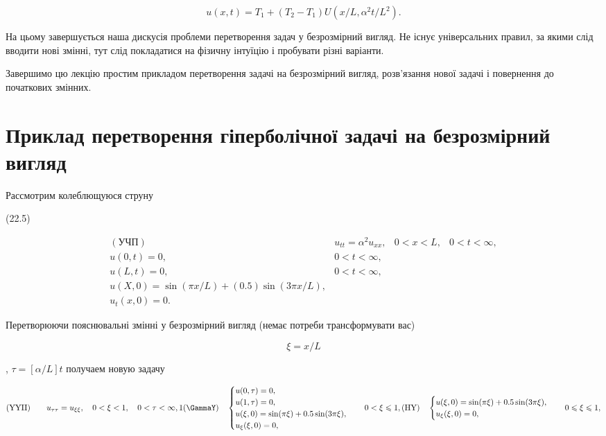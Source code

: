 \documentclass[
  ukrainian,
]{article}
\begin{document}
\[
u(x, t) = T_1 + (T_2 - T_1) U(x/L, \alpha^2 t/L^2).
\]

На цьому завершується наша дискусія проблеми перетворення задач у
безрозмірний вигляд. Не існує універсальних правил, за якими слід
вводити нові змінні, тут слід покладатися на фізичну інтуїцію і
пробувати різні варіанти.

Завершимо цю лекцію простим прикладом перетворення задачі на
безрозмірний вигляд, розв'язання нової задачі і повернення до початкових
змінних.

\section{Приклад перетворення гіперболічної задачі на безрозмірний
вигляд}\label{ux43fux440ux438ux43aux43bux430ux434-ux43fux435ux440ux435ux442ux432ux43eux440ux435ux43dux43dux44f-ux433ux456ux43fux435ux440ux431ux43eux43bux456ux447ux43dux43eux457-ux437ux430ux434ux430ux447ux456-ux43dux430-ux431ux435ux437ux440ux43eux437ux43cux456ux440ux43dux438ux439-ux432ux438ux433ux43bux44fux434}

Рассмотрим колеблющуюся струну

(22.5)

\[
\begin{array}{llll} (\text{УЧП}) & u_{tt} = \alpha^2 u_{xx}, & 0 < x < L, & 0 < t < \infty, \\ u(0, t) = 0, & 0 < t < \infty, \\ u(L, t) = 0, & 0 < t < \infty, \\ u(X, 0) = \sin(\pi x/L) + (0.5)\sin(3\pi x/L), \\ u_t(x, 0) = 0. & \end{array}
\]

Перетворюючи пояснювальні змінні у безрозмірний вигляд (немає потреби
трансформувати вас)

\[
\xi = x/L
\]

, \(\tau = [\alpha/L] t\) получаем новую задачу

\[
(\text{YYII}) \qquad u_{\tau\tau} = u_{\xi\xi}, \quad 0 < \xi < 1, \quad 0 < \tau < \infty, 1
(\text{\GammaY}) \quad
\begin{cases} u(0, \tau) = 0, \\ u(1, \tau) = 0, \\ u(\xi, 0) = \sin(\pi\xi) + 0.5\sin(3\pi\xi), \\ u_{\xi}(\xi, 0) = 0, \end{cases}
\quad 0 < \xi \leqslant 1,
(\text{HY}) \quad
\begin{cases} u(\xi, 0) = \sin(\pi\xi) + 0.5\sin(3\pi\xi), \\ u_{\xi}(\xi, 0) = 0, \end{cases}
\quad 0 \leqslant \xi \leqslant 1,
\]
\end{document}
